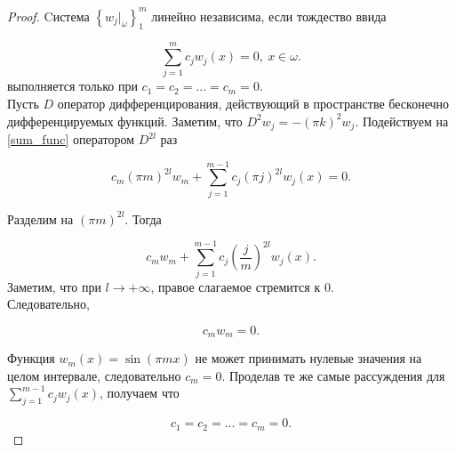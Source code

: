 \begin{proof}
    Cистема $\left\{ w_j|_{\omega} \right\}^m_1$ линейно независима, если 
    тождество ввида
    
    \begin{equation}\label{sum_func}
        \sum \limits_{j = 1}^m{c_j w_j(x)} = 0, \ x \in \omega.
    \end{equation}
    выполняется только при $c_1 = c_2 = ... = c_m = 0.$\\

    Пусть $D$ оператор дифференцирования, действующий в пространстве бесконечно 
    дифференцируемых функций.
    Заметим, что $D^2 w_j = -(\pi k)^2 w_j$. Подействуем  на \eqref{sum_func} 
    оператором $D^{2l}$ раз

    \begin{equation*}
        c_m (\pi m)^{2l} w_m + \sum \limits_{j = 1}^{m - 1}{c_j (\pi j)^{2l}
        w_j(x)} = 0.
    \end{equation*}

    Разделим на $(\pi m)^{2l}$. Тогда

    \begin{equation*}
        c_m w_m + \sum \limits_{j = 1}^{m - 1}{c_j \left(\frac{j}{m}\right)^{2l}
        w_j(x)}.
    \end{equation*}
    Заметим, что при $l \rightarrow +\infty$, правое слагаемое стремится к 0.\\
    Следовательно,

    \begin{equation*}
        c_m w_m = 0.
    \end{equation*}

    Функция $w_m(x) = \sin{(\pi m x)}$ не может принимать нулевые значения на 
    целом интервале, следовательно $c_m = 0$. Проделав те же самые рассуждения 
    для $\sum \limits_{j = 1}^{m - 1}{c_j w_j(x)}$, получаем что

    \begin{equation*}
        c_1 = c_2 = ... = c_m = 0.
    \end{equation*}

\end{proof}

\par
\vspace{2ex}

